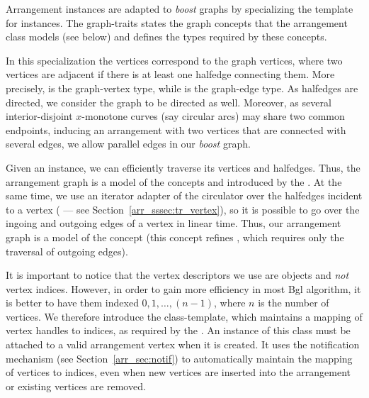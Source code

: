 Arrangement instances are adapted to {\em boost} graphs by specializing the
 template for  instances. The
graph-traits states the graph concepts that the arrangement class models
(see below) and defines the types required by these concepts.

In this specialization the  vertices correspond to the
graph vertices, where two vertices are adjacent if there is at least one
halfedge connecting them. More precisely, 
is the graph-vertex type, while  is the
graph-edge type. As halfedges are directed, we consider the graph to be
directed as well. Moreover, as several interior-disjoint $x$-monotone curves
(say circular arcs) may share two common endpoints, inducing an arrangement
with two vertices that are connected with several edges, we allow parallel
edges in our {\em boost} graph.

Given an  instance, we can efficiently traverse its
vertices and halfedges. Thus, the arrangement graph is a model of the concepts
 and  introduced by the \bgl.
At the same time, we use an iterator adapter of the circulator over the
halfedges incident to a vertex ( --- see
Section~\ref{arr_sssec:tr_vertex}), so it is possible to go over the ingoing
and outgoing edges of a vertex in linear time. Thus, our arrangement graph
is a model of the concept  (this concept refines
, which requires only the traversal of outgoing edges).

It is important to notice that the vertex descriptors we use are
 objects and {\em not} vertex indices. However, in order
to gain more efficiency in most {\sc Bgl} algorithm, it is better to have them
indexed $0, 1, \ldots, (n-1)$, where $n$ is the number of vertices. We
therefore introduce the  class-template,
which maintains a mapping of vertex handles to indices, as required by the
\bgl. An instance of this class must be attached to a valid arrangement
vertex when it is created. It uses the notification mechanism (see
Section~\ref{arr_sec:notif}) to automatically maintain the mapping of vertices
to indices, even when new vertices are inserted into the arrangement or
existing vertices are removed.

